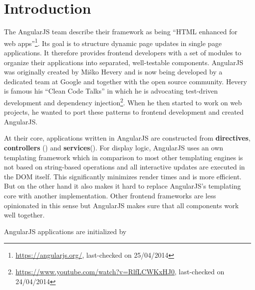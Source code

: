 \section{Introduction}

The AngularJS team describe their framework as being ``HTML enhanced for web apps''\footnote{\url{https://angularjs.org/}, last-checked on 25/04/2014}. Its goal is to structure dynamic page updates in single page applications. It therefore provides frontend developers with a set of modules to organize their applications into separated, well-testable components. AngularJS was originally created by Mi\v{s}ko Hevery and is now being developed by a dedicated team at Google and together with the open source community. Hevery is famous his ``Clean Code Talks'' in which he is advocating test-driven development and dependency injection\footnote{\url{https://www.youtube.com/watch?v=RlfLCWKxHJ0}, last-checked on 24/04/2014}. When he then started to work on web projects, he wanted to port these patterns to frontend development and created AngularJS.

At their core, applications written in AngularJS are constructed from \textbf{directives}, \textbf{controllers} () and \textbf{services}(). For display logic, AngularJS uses an own templating framework which in comparison to most other templating engines is not based on string-based operations and all interactive updates are executed in the DOM itself. This significantly minimizes render times and is more efficient. But on the other hand it also makes it hard to replace AngularJS's templating core with another implementation. Other frontend frameworks are less opinionated in this sense but AngularJS makes sure that all components work well together.

AngularJS applications are initialized by 